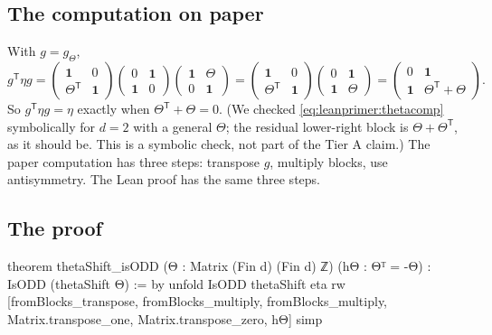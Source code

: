 \subsection{The computation on paper}
With $g=g_\Theta$,
\begin{equation}
g^{\mathsf T}\eta g
=\begin{pmatrix}\mathbf 1&0\\\Theta^{\mathsf T}&\mathbf 1\end{pmatrix}
 \begin{pmatrix}0&\mathbf 1\\\mathbf 1&0\end{pmatrix}
 \begin{pmatrix}\mathbf 1&\Theta\\0&\mathbf 1\end{pmatrix}
=\begin{pmatrix}\mathbf 1&0\\\Theta^{\mathsf T}&\mathbf 1\end{pmatrix}
 \begin{pmatrix}0&\mathbf 1\\\mathbf 1&\Theta\end{pmatrix}
=\begin{pmatrix}0&\mathbf 1\\\mathbf 1&\Theta^{\mathsf T}+\Theta\end{pmatrix}.
\label{eq:leanprimer:thetacomp}
\end{equation}
So $g^{\mathsf T}\eta g=\eta$ exactly when $\Theta^{\mathsf T}+\Theta=0$. (We checked
\eqref{eq:leanprimer:thetacomp} symbolically for $d=2$ with a general $\Theta$; the
residual lower-right block is $\Theta+\Theta^{\mathsf T}$, as it should be. This is a
symbolic check, not part of the Tier A claim.) The paper computation has three steps:
transpose $g$, multiply blocks, use antisymmetry. The Lean proof has the same three steps.

\subsection{The proof}
\begin{leancode}
theorem thetaShift_isODD (Θ : Matrix (Fin d) (Fin d) ℤ) (hΘ : Θᵀ = -Θ) :
    IsODD (thetaShift Θ) := by
  unfold IsODD thetaShift eta
  rw [fromBlocks_transpose, fromBlocks_multiply, fromBlocks_multiply,
    Matrix.transpose_one, Matrix.transpose_zero, hΘ]
  simp
\end{leancode}

